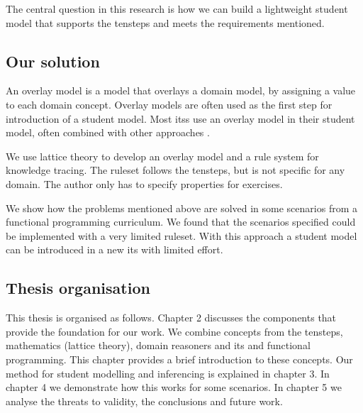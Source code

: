 The central question in this research is how we can build a lightweight student model that supports the \gls{tensteps} and meets the requirements mentioned.

\subsection{Our solution}
An overlay model is a model that overlays a domain model, by assigning a value to each domain concept.
Overlay models are often used as the first step for introduction of a student model.
Most \glspl{its} use an overlay model in their student model, often combined with other approaches \citep{chrysafiadi_2013}.

We use lattice theory to develop an overlay model and a rule system for knowledge tracing. 
The ruleset follows the \gls{tensteps}, but is not specific for any domain.
The author only has to specify properties for exercises.

We show how the problems mentioned above are solved in some scenarios from a functional programming curriculum.
We found that the scenarios specified could be implemented with a very limited ruleset.
With this approach a student model can be introduced in a new \gls{its} with limited effort.



\subsection{Thesis organisation}
This thesis is organised as follows. 
Chapter 2 discusses the components that provide the foundation for our work.
We combine concepts from the \gls{tensteps}, mathematics (lattice theory), domain reasoners and \gls{its} and functional programming.
This chapter provides a brief introduction to these concepts.
Our method for student modelling and inferencing is explained in chapter 3.
In chapter 4 we demonstrate how this works for some scenarios.
In chapter 5 we analyse the threats to validity, the conclusions and future work.

















